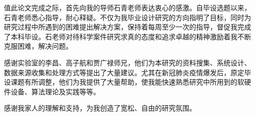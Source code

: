 %
%
%
%
%
%

\renewcommand{\thechapter}{致谢}



值此论文完成之际，首先向我的导师石青老师表达衷心的感激。自毕设选题以来，石青老师悉心指导，耐心释疑。不仅为我毕业设计研究的方向指明了目标，同时为研究过程中所遇到的困难提出解决方案，保持着每周至少一次的指导，督促我完成了本科毕设。石老师对待科学案件研究求真的态度和追求卓越的精神激励着我不断克服困难，解决问题。

感谢实验室的李昌、高子航和贾广禄师兄，他们为本研究的资料搜集、系统设计、数据来源收集和处理方式等提出了大量建议。尤其在新冠肺炎疫情爆发后，原定毕设课题有所调整，他们为我提供了大量帮助，使我能快速熟悉研究中所用到的软硬件设备、算法理论及实践等等。

感谢我家人的理解和支持，为我创造了宽松、自由的研究氛围。
